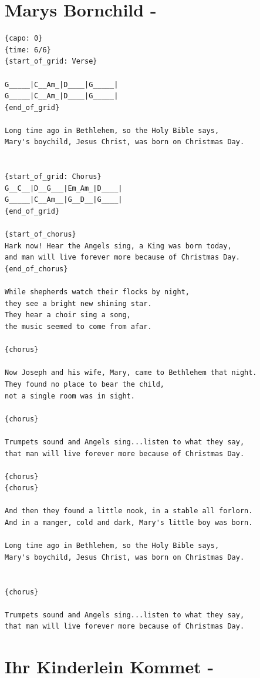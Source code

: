 \documentclass[
]{book}
\let\stdsection\section
\renewcommand\section{\clearpage\stdsection}
\begin{document}
\hypertarget{marys-bornchild--}{%
\section{Marys Bornchild -}\label{marys-bornchild--}}

\begin{verbatim}
{capo: 0}
{time: 6/6}
{start_of_grid: Verse}

G_____|C__Am_|D____|G_____|
G_____|C__Am_|D____|G_____|
{end_of_grid}

Long time ago in Bethlehem, so the Holy Bible says,  
Mary's boychild, Jesus Christ, was born on Christmas Day. 


{start_of_grid: Chorus}
G__C__|D__G___|Em_Am_|D____|
G_____|C__Am__|G__D__|G____|
{end_of_grid}

{start_of_chorus}
Hark now! Hear the Angels sing, a King was born today, 
and man will live forever more because of Christmas Day. 
{end_of_chorus}  

While shepherds watch their flocks by night, 
they see a bright new shining star. 
They hear a choir sing a song,  
the music seemed to come from afar.  
  
{chorus} 

Now Joseph and his wife, Mary, came to Bethlehem that night. 
They found no place to bear the child,  
not a single room was in sight.      
  
{chorus}

Trumpets sound and Angels sing...listen to what they say, 
that man will live forever more because of Christmas Day. 

{chorus}
{chorus}
  
And then they found a little nook, in a stable all forlorn. 
And in a manger, cold and dark, Mary's little boy was born.

Long time ago in Bethlehem, so the Holy Bible says,  
Mary's boychild, Jesus Christ, was born on Christmas Day. 

  
{chorus}

Trumpets sound and Angels sing...listen to what they say, 
that man will live forever more because of Christmas Day.
\end{verbatim}

\hypertarget{ihr-kinderlein-kommet--}{%
\section{Ihr Kinderlein Kommet -}\label{ihr-kinderlein-kommet--}}
\end{document}
